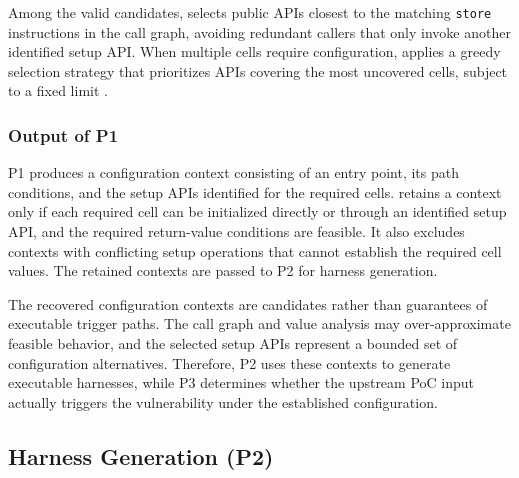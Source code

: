 Among the valid candidates, \sys selects public APIs closest to the matching \texttt{store} instructions in the call graph, avoiding redundant callers that only invoke another identified setup API. When multiple cells require configuration, \sys applies a greedy selection strategy that prioritizes APIs covering the most uncovered cells, subject to a fixed limit .

\subsubsection{Output of P1}
P1 produces a configuration context consisting of an entry point, its path conditions, and the setup APIs identified for the required cells.
%
\sys retains a context only if each required cell can be initialized directly or through an identified setup API, and the required return-value conditions are feasible.
It also excludes contexts with conflicting setup operations that cannot establish the required cell values.
The retained contexts are passed to P2 for harness generation.


The recovered configuration contexts are candidates rather than guarantees of executable trigger paths. The call graph and value analysis may over-approximate feasible behavior, and the selected setup APIs represent a bounded set of configuration alternatives. Therefore, P2 uses these contexts to generate executable harnesses, while P3 determines whether the upstream PoC input actually triggers the vulnerability under the established configuration.

\subsection{Harness Generation (P2)}\label{subsec:p2}

